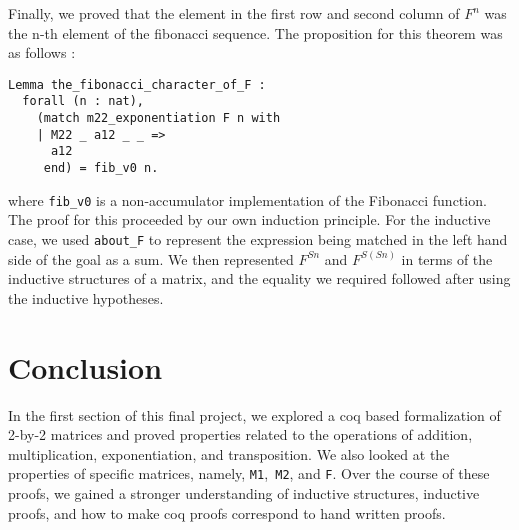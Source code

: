 \documentclass[12pt, a4paper]{article}
\begin{document}
Finally, we proved that the element in the first row and second column of $F^n$ 
was the n-th element of the fibonacci sequence. The proposition for this
theorem was as follows :


\begin{lstlisting}
Lemma the_fibonacci_character_of_F :
  forall (n : nat),
    (match m22_exponentiation F n with
    | M22 _ a12 _ _ =>
      a12
     end) = fib_v0 n.
\end{lstlisting}

where \verb-fib_v0- is a non-accumulator implementation of the Fibonacci function. 
The proof for this proceeded by our own induction principle. For the inductive case,
we used \verb-about_F- to represent the expression being matched in the
left hand side of the goal as a sum. We then represented $F^{S n}$ and $F^{S (S n)}$ 
in terms of the inductive structures of a matrix, and the equality we required 
followed after using the inductive hypotheses. 

\section {Conclusion}

In the first section of this final project, we explored a coq based formalization 
of 2-by-2 matrices and proved properties related to the operations of addition,
multiplication, exponentiation, and transposition. We also looked at the properties
of specific matrices, namely, \verb-M1-,\verb- M2-, and \verb-F-. Over the course of 
these proofs, we gained a stronger understanding of inductive structures, inductive 
proofs, and how to make coq proofs correspond to hand written proofs. 
\end{document}
